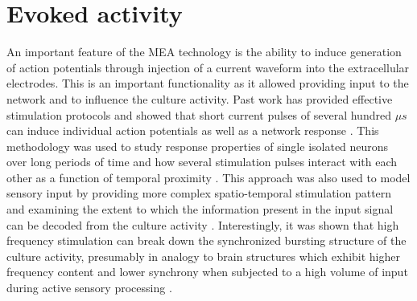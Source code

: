     \section{Evoked activity}
    \label{sec:activity:evoked}
    An important feature of the MEA technology is the ability to induce generation of action potentials through injection of a current waveform into the extracellular electrodes. This is an important functionality as it allowed providing input to the network and to influence the culture activity. Past work has provided effective stimulation protocols and showed that short current pulses of several hundred \(\mu s\) can induce individual action potentials as well as a network response \cite{marom2002development,wagenaar2004effective}. This methodology was used to study response properties of single isolated neurons over long periods of time \cite{gal2013entrainment} and how several stimulation pulses interact with each other as a function of temporal proximity \cite{eytan2003selective,weihberger2013quantitative,baljon2009interaction}. This approach was also used to model sensory input by providing more complex spatio-temporal stimulation pattern and examining the extent to which the information present in the input signal can be decoded from the culture activity \cite{marom2009precarious,cozzi2006encoding}. Interestingly, it was shown that high frequency stimulation can break down the synchronized bursting structure of the culture activity, presumably in analogy to brain structures which exhibit higher frequency content and lower synchrony when subjected to a high volume of input during active sensory processing \cite{wagenaar2005controlling}.

